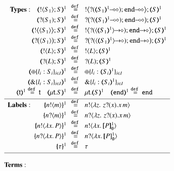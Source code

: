 \begin{figure}[t]
\[
\begin{array}{l}
\begin{array}{rcll}
\noindent{\bf Types:} \quad 
		\tmap{\btout{S_1} {S} }{1}	&\!\!\defeq\!\!&	\bbtout{\lhot{\btinp{\lhot{\tmap{S_1}{1}}}\tinact}} \tmap{S}{1}  \\
		\tmap{\btinp{S_1} S }{1}	&\!\!\defeq\!\!&	\bbtinp{\lhot{\btinp{\lhot{\tmap{S_1}{1}}}\tinact}} \tmap{S}{1} \\
		\tmap{\bbtout{\chtype{S_1}} {S} }{1}	&\!\!\defeq\!\!&	\bbtout{\shot{\btinp{\shot{\chtype{\tmap{S_1}{1}}}}\tinact}} \tmap{S}{1}  \\
		\tmap{\bbtinp{\chtype{S_1}} {S} }{1}	&\!\!\defeq\!\!&	\bbtinp{\shot{\btinp{\shot{\chtype{\tmap{S_1}{1}}}}\tinact}} \tmap{S}{1} \\
		\tmap{\btout{L} S}{1} &\!\!\defeq\!\!& \btout{L} \tmap{S}{1}\\
		\tmap{\btinp{L} S}{1} &\!\!\defeq\!\!& \btinp{L} \tmap{S}{1}\\
		\tmap{\btsel{l_i: S_i}_{i \in I}}{1} &\!\!\defeq\!\!& \btsel{l_i: \tmap{S_i}{1}}_{i \in I}\\
		\tmap{\btbra{l_i: S_i}_{i \in I}}{1} &\!\!\defeq\!\!& \btbra{l_i: \tmap{S_i}{1}}_{i \in I}\\
\tmap{\vart{t}}{1} \defeq \vart{t} \quad 
		\tmap{\trec{t}{S}}{1}  &\!\!\defeq\!\!&
\trec{t}{\tmap{S}{1}}\quad 
\tmap{\tinact}{1}  \defeq  \tinact\\[1mm]
\hline
\noindent{\bf Labels:} \quad \quad 
	\mapa{\bactout{n}{m}}^{1} &\!\!\defeq\!\!&   \bactout{n}{\abs{z}{\,\binp{z}{x} \appl{x}{m}} } \\
	\mapa{\bactinp{n}{m}}^{1} &\!\!\defeq\!\!&   \bactinp{n}{\abs{z}{\,\binp{z}{x} \appl{x}{m}} } \\
		\mapa{\bactout{n}{\abs{{x}}{P}}}^{1} &\!\!\defeq\!\!& \bactout{n}{\abs{{x}}{\pmapp{P}{1}{\es}}}\\
		\mapa{\bactinp{n}{\abs{{x}}{P}}}^{1} &\!\!\defeq\!\!& \bactinp{n}{\abs{{x}}{\pmapp{P}{1}{\es}}}\\
		\mapa{\tau}^{1} &\!\!\defeq\!\!& \tau
\\[1mm]
\hline
\\
\end{array}
\\
\noindent{\bf Terms:}\\
\begin{array}{rcll}

\end{array}
\end{array}\]
\end{figure}
